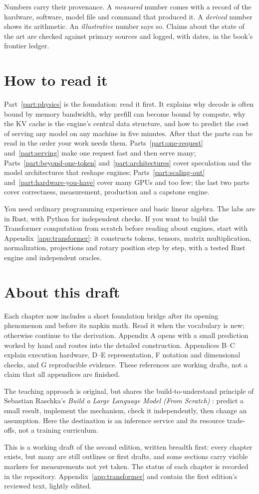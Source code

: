 Numbers carry their provenance. A \emph{measured} number comes with a record
of the hardware, software, model file and command that produced it. A
\emph{derived} number shows its arithmetic. An \emph{illustrative} number says
so. Claims about the state of the art are checked against primary sources and
logged, with dates, in the book's frontier ledger.

\section*{How to read it}
Part~\ref{part:physics} is the foundation: read it first. It explains why
decode is often bound by memory bandwidth, why prefill can become bound by compute, why the
KV cache is the engine's central data structure, and how to predict the cost
of serving any model on any machine in five minutes. After that the parts can
be read in the order your work needs them. Parts~\ref{part:one-request}
and~\ref{part:serving} make one request fast and then serve many;
Parts~\ref{part:beyond-one-token} and~\ref{part:architectures} cover
speculation and the model architectures that reshape engines;
Parts~\ref{part:scaling-out} and~\ref{part:hardware-you-have} cover many GPUs
and too few; the last two parts cover correctness, measurement, production
and a capstone engine.

You need ordinary programming experience and basic linear algebra. The labs
are in Rust, with Python for independent checks. If you want to build the
Transformer computation from scratch before reading about engines, start with
Appendix~\ref{app:transformer}: it constructs tokens, tensors, matrix
multiplication, normalization, projections and rotary position step by step,
with a tested Rust engine and independent oracles.

\section*{About this draft}
Each chapter now includes a short foundation bridge after its opening
phenomenon and before its napkin math. Read it when the vocabulary is new;
otherwise continue to the derivation. Appendix A opens with a small
prediction worked by hand and routes into the detailed construction.
Appendices B--C explain execution hardware, D--E representation, F notation
and dimensional checks, and G reproducible evidence. These references are
working drafts, not a claim that all appendices are finished.

The teaching approach is original, but shares the build-to-understand
principle of Sebastian Raschka's \emph{Build a Large Language Model
(From Scratch)} \cite{raschka2024build}: predict a small result, implement
the mechanism, check it independently, then change an assumption.
Here the destination is an inference service and its resource trade-offs,
not a training curriculum.

This is a working draft of the second edition, written breadth first: every
chapter exists, but many are still outlines or first drafts, and some sections
carry visible markers for measurements not yet taken. The status of each
chapter is recorded in the repository. Appendix~\ref{app:transformer} and
 contain the first edition's reviewed text, lightly
edited.
